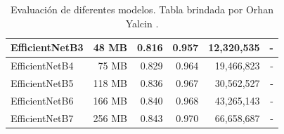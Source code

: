 \begin{table}[h!]
\begin{tabular}{|l|r|r|r|r|r|}
    EfficientNetB3    & 48 MB                              & 0.816                                                                                   & 0.957                                                                                   & 12,320,535                               & -                                   \\ \hline
    EfficientNetB4    & 75 MB                              & 0.829                                                                                   & 0.964                                                                                   & 19,466,823                               & -                                   \\ \hline
    EfficientNetB5    & 118 MB                             & 0.836                                                                                   & 0.967                                                                                   & 30,562,527                               & -                                   \\ \hline
    EfficientNetB6    & 166 MB                             & 0.840                                                                                   & 0.968                                                                                   & 43,265,143                               & -                                   \\ \hline
    EfficientNetB7    & 256 MB                             & 0.843                                                                                   & 0.970                                                                                   & 66,658,687                               & -                                   \\ \hline
    \end{tabular}
    \caption{Evaluación de diferentes modelos. Tabla brindada por Orhan Yalcin \protect\cite{DataModelos}. }
    \label{evaluación}
\end{table}


